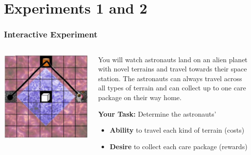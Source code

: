 \documentclass{beamer}
\begin{document}
\section{Experiments 1 and 2}

\begin{frame}
\frametitle{Interactive Experiment}
\begin{columns}
\begin{column}{0.4\textwidth}
\begin{center}
\includegraphics[width=\textwidth]{experiment_1a-1.png}
\end{center}
\end{column}
\begin{column}{0.6\textwidth}
You will watch astronauts land on an alien planet with novel terrains and travel towards their space station. The astronauts can always travel across all types of terrain and can collect up to one care package on their way home.

\vspace{0.5cm}
\textbf{Your Task:} Determine the astronauts'
\begin{itemize}
    \item \textbf{Ability} to travel each kind of terrain (costs)
    \item \textbf{Desire} to collect each care package (rewards)
\end{itemize}
\end{column}
\end{columns}
\end{frame}
\end{document}
